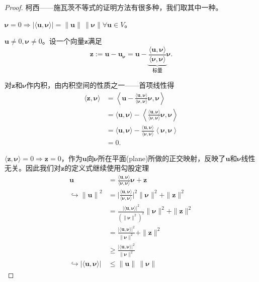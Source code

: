 \begin{proof}
  柯西——施瓦茨不等式的证明方法有很多种\citep{Wu:2011uc}，我们取其中一种。

  $\bm{\nu} = 0 \Rightarrow \big| \langle \bm{u},\bm{\nu} \rangle \big| = \| \bm{u} \| \, \| \bm{\nu} \| \forall \bm{u} \in V$。

  $\bm{u} \neq 0, \bm{\nu} \neq 0$。设一个向量$\bm{z}$满足
  \begin{equation*}
    \bm{z} := \bm{u} - \bm{u_{\nu}} = \bm{u} - \underbrace{\frac{\langle \bm{u}, \bm{\nu} \rangle}{\langle \bm{\nu}, \bm{\nu} \rangle}}_{\text{标量}} \bm{\nu}.
  \end{equation*}

  对$\bm{z}$和$\bm{\nu}$作内积，由内积空间的性质之一——首项线性得
  \begin{equation*}
    \begin{split}
      \langle \bm{z}, \bm{\nu} \rangle &= \left\langle \bm{u} - \frac{\langle \bm{u}, \bm{\nu} \rangle}{\langle \bm{\nu}, \bm{\nu} \rangle} \bm{\nu}, \bm{\nu} \right\rangle \\
      &= \langle \bm{u}, \bm{\nu} \rangle - \left\langle \frac{\langle \bm{u}, \bm{\nu} \rangle}{\langle \bm{\nu}, \bm{\nu} \rangle} \bm{\nu}, \bm{\nu} \right\rangle \\
      &= \langle \bm{u}, \bm{\nu} \rangle - \frac{\langle \bm{u}, \bm{\nu} \rangle}{\langle \bm{\nu}, \bm{\nu} \rangle} \left\langle  \bm{\nu}, \bm{\nu} \right\rangle \\
      &=0.
    \end{split}
  \end{equation*}

  $\langle \bm{z}, \bm{\nu} \rangle = 0 \Rightarrow \bm{z}=0$，作为$\bm{u}$向$\bm{\nu}$所在平面(plane)所做的正交映射，反映了$\bm{u}$和$\bm{\nu}$线性无关。因此我们对$\bm{z}$的定义式继续使用勾股定理
  \begin{equation}
    \begin{split}
      \bm{u} & = \frac{\langle \bm{u}, \bm{\nu} \rangle}{\langle \bm{\nu}, \bm{\nu} \rangle} \bm{\nu} + \bm{z} \\
      \hookrightarrow \left\| \bm{u} \right\|^2 &= \Big| \frac{\langle \bm{u}, \bm{\nu} \rangle}{\langle \bm{\nu}, \bm{\nu} \rangle} \Big|^2  \| \bm{\nu} \|^2 + \| \bm{z}\|^2 \\
      &= \frac{
      \big| \langle \bm{u}, \bm{\nu} \rangle \big|^2
      }{
      \left( \| \bm{\nu} \|^2 \right)^2 }
      \| \bm{\nu} \|^2  + \| \bm{z} \|^2 \\
      &= \frac{
      \big| \langle \bm{u}, \bm{\nu} \rangle \big|^2
      }{
       \| \bm{\nu} \|^2 } + \| \bm{z} \|^2 \\
       & \ge \frac{
       \big| \langle \bm{u}, \bm{\nu} \rangle \big|^2
       }{
        \| \bm{\nu} \|^2 }\\
        \hookrightarrow \left| \langle \bm{u}, \bm{\nu}  \rangle \right| & \le \| \bm{u} \| \, \| \bm{\nu} \|
    \end{split}
  \end{equation}
\end{proof}

